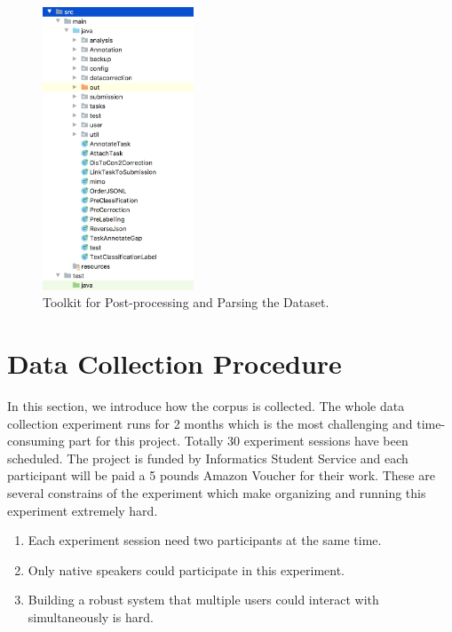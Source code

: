 \documentclass[bsc,frontabs,twoside,singlespacing,parskip,deptreport]{infthesis}     %
\begin{document}
\begin{figure}[h]
    \centering
    \includegraphics[width=0.4\textwidth]{parser.png}
    \caption{Toolkit for Post-processing and Parsing the Dataset.}
    \label{fig:parser}
\end{figure}



\newpage
\section{Data Collection Procedure}

In this section, we introduce how the corpus is collected. The whole data collection experiment runs for 2 months which is the most challenging and time-consuming part for this project. Totally 30 experiment sessions have been scheduled. The project is funded by Informatics Student Service and each participant will be paid a 5 pounds Amazon Voucher for their work. These are several constrains of the experiment which make organizing and running this experiment extremely hard.

\begin{enumerate}
   \item Each experiment session need two participants at the same time. 

   \item Only native speakers could participate in this experiment.
 
   \item Building a robust system that multiple users could interact with simultaneously is hard. 
       
\end{enumerate}
\end{document}
